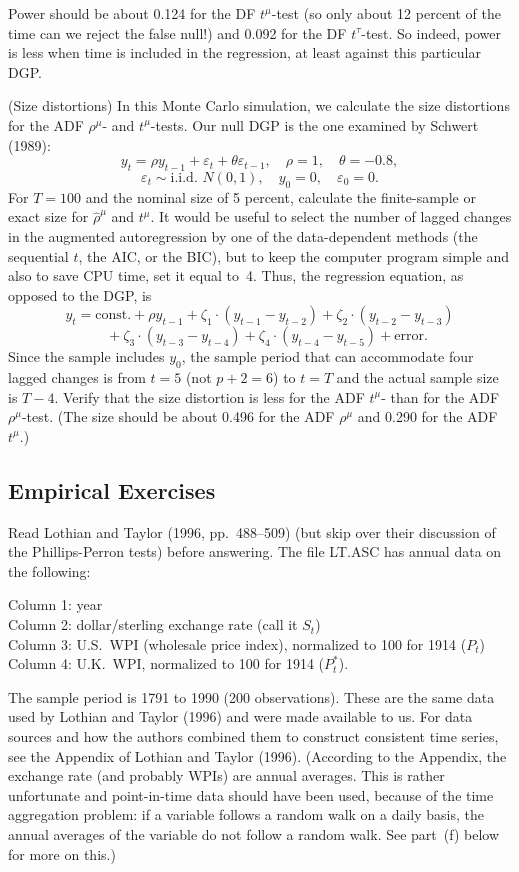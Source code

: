 \begin{problemset}
Power should be about 0.124 for the DF $t^\mu$-test (so only about 12 percent of
the time can we reject the false null!) and 0.092 for the DF $t^\tau$-test. So indeed,
power is less when time is included in the regression, at least against this particular DGP.

\exercise[2]
(Size distortions) \enspace In this Monte Carlo simulation, we calculate the size distortions for the ADF $\rho^\mu$- and $t^\mu$-tests. Our null DGP is the one examined by
Schwert (1989):
\[
y_t = \rho y_{t-1} + \varepsilon_t + \theta\varepsilon_{t-1}, \quad
\rho = 1, \quad \theta = -0.8,
\]
\[
\varepsilon_t \sim \text{i.i.d.\ } N(0, 1), \quad y_0 = 0, \quad \varepsilon_0 = 0.
\]
For $T = 100$ and the nominal size of 5 percent, calculate the finite-sample or
exact size for $\hat{\rho}^\mu$ and $t^\mu$. It would be useful to select the number of lagged
changes in the augmented autoregression by one of the data-dependent methods (the sequential $t$, the AIC, or the BIC), but to keep the computer program
simple and also to save CPU time, set it equal to~4. Thus, the regression equation, as opposed to the DGP, is
\[
y_t = \text{const.} + \rho y_{t-1} + \zeta_1 \cdot (y_{t-1} - y_{t-2})
+ \zeta_2 \cdot (y_{t-2} - y_{t-3})
\]
\[
\quad + \zeta_3 \cdot (y_{t-3} - y_{t-4}) + \zeta_4 \cdot (y_{t-4} - y_{t-5}) + \text{error}.
\]
Since the sample includes $y_0$, the sample period that can accommodate four
lagged changes is from $t = 5$ (not $p + 2 = 6$) to $t = T$ and the actual sample
size is $T - 4$. Verify that the size distortion is less for the ADF $t^\mu$- than for the
ADF $\rho^\mu$-test. (The size should be about 0.496 for the ADF $\rho^\mu$ and 0.290 for
the ADF $t^\mu$.)

\subsection*{Empirical Exercises}

Read Lothian and Taylor (1996, pp.~488--509) (but skip over their discussion of the
Phillips-Perron tests) before answering. The file LT.ASC has annual data on the
following:

\medskip\noindent
Column 1: year\\
Column 2: dollar/sterling exchange rate (call it $S_t$)\\
Column 3: U.S.\ WPI (wholesale price index), normalized to 100 for 1914 ($P_t$)\\
Column 4: U.K.\ WPI, normalized to 100 for 1914 ($P_t^*$).

\medskip\noindent
The sample period is 1791 to 1990 (200 observations). These are the same data
used by Lothian and Taylor (1996) and were made available to us. For data sources
and how the authors combined them to construct consistent time series, see the
Appendix of Lothian and Taylor (1996). (According to the Appendix, the exchange
rate (and probably WPIs) are annual averages. This is rather unfortunate and point-in-time data should have been used, because of the time aggregation problem: if a
variable follows a random walk on a daily basis, the annual averages of the variable
do not follow a random walk. See part~(f) below for more on this.)


\end{problemset}
